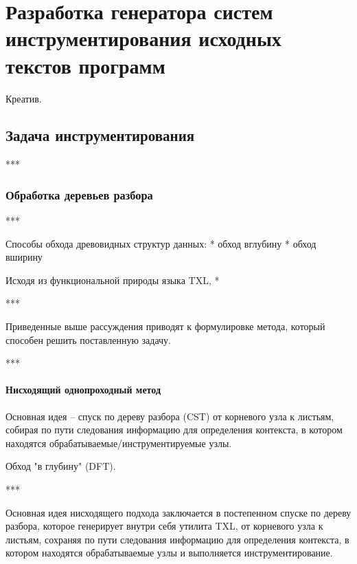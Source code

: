 \chapter{Разработка генератора систем инструментирования исходных текстов программ}

Креатив.

\section{Задача инструментирования}

***

\subsection{Обработка деревьев разбора}

***

Способы обхода древовидных структур данных:
* обход вглубину
* обход вширину

Исходя из функциональной природы языка TXL, *

***

Приведенные выше рассуждения приводят к формулировке метода, который способен решить поставленную задачу.

***

\subsubsection{Нисходящий однопроходный метод}

Основная идея -- спуск по дереву разбора (CST) от корневого узла к листьям, собирая по пути следования информацию для определения контекста, в котором находятся обрабатываемые/инструментируемые узлы.

Обход "в глубину" (DFT).

***

Основная идея нисходящего подхода заключается в постепенном спуске по дереву разбора, которое генерирует внутри себя утилита TXL, от корневого узла к листьям, сохраняя по пути следования информацию для определения контекста, в котором находятся обрабатываемые узлы и выполняется инструментирование.

